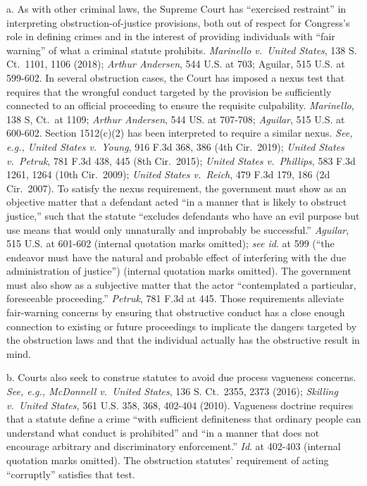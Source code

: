 a. As with other criminal laws, the Supreme Court has “exercised restraint” in interpreting obstruction-of-justice provisions, both out of respect for Congress’s role in defining crimes and in the interest of providing individuals with “fair warning” of what a criminal statute prohibits.
\textit{Marinello v.\ United States}, 138 S. Ct.~1101, 1106 (2018);
\textit{Arthur Andersen}, 544 U.S. at 703; Aguilar, 515 U.S. at 599-602.
In several obstruction cases, the Court has imposed a nexus test that requires that the wrongful conduct targeted by the provision be sufficiently connected to an official proceeding to ensure the requisite culpability.
\textit{Marinello}, 138 S, Ct.~at 1109;
\textit{Arthur Andersen}, 544 US. at 707-708;
\textit{Aguilar}, 515 U.S. at 600-602.
Section 1512(c)(2) has been interpreted to require a similar nexus.
\textit{See, e.g., United States v.\ Young}, 916 F.3d 368, 386 (4th Cir.~2019);
\textit{United States v.\ Petruk}, 781 F.3d 438, 445 (8th Cir.~2015);
\textit{United States v.\ Phillips}, 583 F.3d 1261, 1264 (10th Cir.~2009);
\textit{United States v.\ Reich}, 479 F.3d 179, 186 (2d Cir.~2007).
To satisfy the nexus requirement, the government must show as an objective matter that a defendant acted “in a manner that is likely to obstruct justice,” such that the statute “excludes defendants who have an evil purpose but use means that would only unnaturally and improbably be successful.”
\textit{Aguilar}, 515 U.S. at 601-602 (internal quotation marks omitted);
\textit{see id}. at 599 (“the endeavor must have the natural and probable effect of interfering with the due administration of justice”) (internal quotation marks omitted).
The government must also show as a subjective matter that the actor “contemplated a particular, foreseeable proceeding.”
\textit{Petruk}, 781 F.3d at 445.
Those requirements alleviate fair-warning concerns by ensuring that obstructive conduct has a close enough connection to existing or future proceedings to implicate the dangers targeted by the obstruction laws and that the individual actually has the obstructive result in mind.

b. Courts also seek to construe statutes to avoid due process vagueness concerns.
\textit{See, e.g., McDonnell v.\ United States}, 136 S. Ct.~2355, 2373 (2016);
\textit{Skilling v.\ United States}, 561 U.S. 358, 368, 402-404 (2010).
Vagueness doctrine requires that a statute define a crime “with sufficient definiteness that ordinary people can understand what conduct is prohibited” and “in a manner that does not encourage arbitrary and discriminatory enforcement.”
\textit{Id}. at 402-403 (internal quotation marks omitted).
The obstruction statutes’ requirement of acting “corruptly” satisfies that test.

